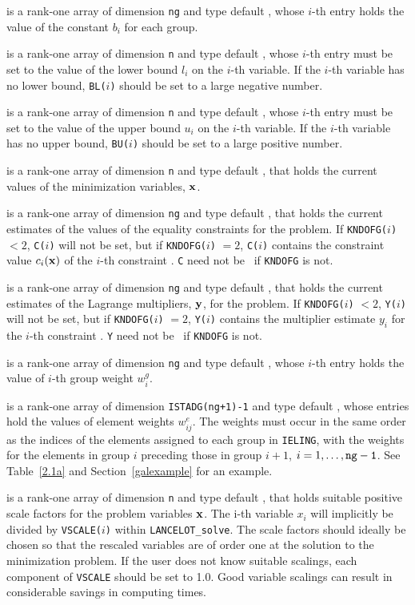 \documentclass{galahad}
\newcommand{\fullpackagename}{LANC\-E\-LOT}
\newcommand{\solver}{{\tt \fullpackagename\_solve}}
\begin{document}
\begin{description}
 is a rank-one array of dimension {\tt ng} and type
default \realdp, whose $i$-th entry holds the value of the constant
$b_i$ for each group.

 is a rank-one array of dimension {\tt n} and type
default \realdp, whose $i$-th entry must be set
to the value of the lower bound $l_i$ on the $i$-th variable.
If the $i$-th variable has no lower bound, {\tt BL($i$)} should be set to
a large negative number.

 is a rank-one array of dimension {\tt n} and type
default \realdp, whose $i$-th
entry must be set
to the value of the upper bound $u_i$ on the $i$-th variable.
If the $i$-th variable has no upper bound, {\tt BU($i$)} should be set to
a large positive number.

 is a rank-one array of dimension {\tt n} and type
default \realdp, that holds the current values of the
minimization variables, ${\mathbf{x}}$.

 is a rank-one array of dimension {\tt ng} and type
default \realdp, that holds the current estimates of the values of the
equality constraints
for the problem.
If {\tt KNDOFG($i$)} $<2$, {\tt C($i$)}
will not be set, but if {\tt KNDOFG($i$)} $= 2$, {\tt C($i$)} contains
the constraint value $c_i({\mathbf{x}})$
of the $i$-th constraint .
{\tt C} need not be \associated\ if {\tt KNDOFG} is not.

 is a rank-one array of dimension {\tt ng} and type
default \realdp, that holds the current estimates of the Lagrange multipliers,
${\mathbf{y}}$, for the problem. If {\tt KNDOFG($i$)} $<2$, {\tt Y($i$)}
will not be set, but if {\tt KNDOFG($i$)} $= 2$, {\tt Y($i$)} contains
the multiplier estimate $y_i$
for the $i$-th constraint .
{\tt Y} need not be \associated\ if {\tt KNDOFG} is not.

 is a rank-one array of dimension {\tt ng} and type
default \realdp, whose $i$-th entry holds
the value of $i$-th group weight $w^g_i$.

 is a rank-one array of dimension {\tt ISTADG(ng+1)-1} and type
default \realdp, whose entries hold the values of element weights
$w^e_{ij}$. The weights must occur in the same order as the indices of the
elements assigned to each group
in {\tt IELING}, with the weights for the elements
in group $i$ preceding those in group $i+1$, $i=1, \ldots, {\tt ng-1}$.
See Table~\ref{2.1a} and Section~\ref{galexample} for an example.

 is a rank-one array of dimension {\tt n} and type
default \realdp, that holds suitable positive scale
factors for the problem variables ${\mathbf{x}}$.
The {i}-th variable $x_i$ will implicitly be divided by
{\tt VSCALE($i$)} within \solver. The scale factors should ideally
be chosen so that the rescaled variables are of order one at the
solution to the minimization problem. If the user does not know
suitable scalings, each component of {\tt VSCALE} should be set to 1.0.
Good variable scalings can result in considerable savings in
computing times.


\end{description}
\end{document}
